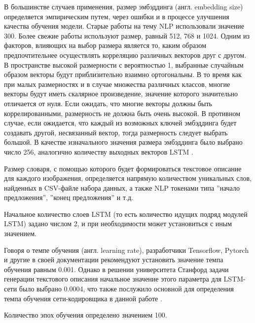 \documentclass[bachelor, och, coursework]{SCWorks}
\begin{document}
        В большинстве случаев применения, размер эмбэддинга (англ. embedding
        size) определяется эмпирическим путем, через ошибки и в процессе
        улучшения качества обучения модели. Старые работы на тему NLP
        использовали значение 300. Более свежие работы используют размер, равный
        512, 768 и 1024. Одним из факторов, влияющих на выбор размера является
        то, каким образом предпочтительнее осуществлять корреляцию различных
        векторов друг с другом. В пространстве высокой размерности с
        вероятностью 1, выбранные случайным образом векторы будут приблизительно
        взаимно ортогональны. В то время как при малых размерностях и в случае
        множества различных классов, многие векторы будут иметь скалярное
        произведение, значение которого значительно отличается от нуля. Если
        ожидать, что многие векторы должны быть коррелированными, размерность не
        должна быть очень высокой. В противном случае, если ожидается, что
        каждый из возможных ключей эмбэддинга будет создавать другой,
        несвязанный вектор, тогда размерность следует выбрать большой. В
        качестве изначального значения размера эмбэддинга было выбрано число
        256, аналогично количеству выходных векторов LSTM \cite{embedding}.
        
        Размер словаря, с помощью которого будет формироваться текстовое
        описание для каждого изображения, определяется напрямую количеством
        уникальных слов, найденных в CSV-файле набора данных, а также NLP
        токенами типа ''начало предложения'', ''конец предложения'' и т.д.
        
        Начальное количество слоев LSTM (то есть количество идущих подряд
        модулей LSTM) задано числом 2, и при необходимости может установиться с
        иным значением.
        
        Говоря о темпе обучения (англ. learning rate), разработчики Tensorflow,
        Pytorch и другие в своей документации рекомендуют установить значение
        темпа обучения равным 0.001. Однако в решении университета Станфорд
        задачи генерации текстового описания начальное значение этого параметра
        для LSTM-сети было выбрано 0.0004, что также послужило основной для
        определения темпа обучения сети-кодировщика в данной работе
        \cite{learningrate}.
        
        Количество эпох обучения определено значением 100.

\end{document}
